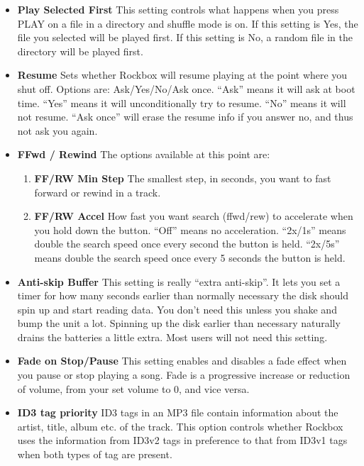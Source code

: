 \begin{itemize}
\begin{itemize}
\item \textbf{Play Selected First}
  This setting controls what happens when you press PLAY on a file in a directory and shuffle mode is on. If this setting is Yes, the file you selected will be played first. If this setting is No, a random file in the directory will be played first.
\item \textbf{Resume}
  Sets whether Rockbox will resume playing at the point where you shut off. Options are: Ask/Yes/No/Ask once. ``Ask'' means it will ask at boot time. ``Yes'' means it will unconditionally try to resume. ``No'' means it will not resume. ``Ask once'' will erase the resume info if you answer no, and thus not ask you again.
\item \textbf{FFwd / Rewind}
  The options available at this point are:
  \begin{enumerate}
  \item \textbf{FF/RW Min Step}
    The smallest step, in seconds, you want to fast forward or rewind in a
    track.
  \item \textbf{FF/RW Accel}
    How fast you want search (ffwd/rew) to accelerate when you hold
    down the button. ``Off'' means no acceleration. ``2x/1s'' means double the
    search speed once every second the button is held. ``2x/5s'' means double the search speed once every 5 seconds the button is held.
  \end{enumerate}
  
\item \textbf{Anti{}-skip Buffer}
  This setting is really ``extra anti{}-skip''. It lets you set a timer for how many seconds earlier than normally necessary the disk should spin up and start reading data. You don't need this unless you shake and bump the unit a lot. Spinning up the disk earlier than necessary naturally drains the batteries a little extra. Most users will not need this setting.

\item \textbf{Fade on Stop/Pause}
  This setting enables and disables a fade effect when you pause or stop playing a song. Fade is a progressive increase or reduction of volume, from your set volume to 0, and vice versa.

\item \textbf{ID3 tag priority}
  ID3 tags in an MP3 file contain information about the artist, title, album etc. of the track.  This option controls whether Rockbox uses the information from ID3v2 tags in preference to that from ID3v1 tags when both types of tag are present.
\end{itemize}


\end{itemize}
